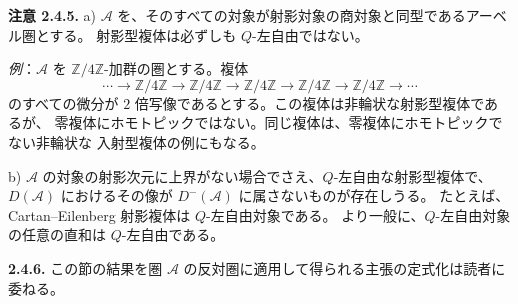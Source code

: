 \clearpage
{}%
\begingroup\small\setlength{\parskip}{0pt}\setlength{\emergencystretch}{1.5em}
\setlength{\abovedisplayskip}{4pt plus 2pt minus 2pt}%
\setlength{\belowdisplayskip}{4pt plus 2pt minus 2pt}%

\noindent\textbf{注意 2.4.5.}\quad
a) $\mathcal A$ を、そのすべての対象が射影対象の商対象と同型であるアーベル圏とする。
射影型複体は必ずしも $Q$-左自由ではない。

\emph{例}：$\mathcal A$ を $\mathbb Z/4\mathbb Z$-加群の圏とする。複体
\[
\cdots\longrightarrow\mathbb Z/4\mathbb Z
\longrightarrow\mathbb Z/4\mathbb Z
\longrightarrow\mathbb Z/4\mathbb Z
\longrightarrow\mathbb Z/4\mathbb Z
\longrightarrow\mathbb Z/4\mathbb Z\longrightarrow\cdots
\]
のすべての微分が $2$ 倍写像であるとする。この複体は非輪状な射影型複体であるが、
零複体にホモトピックではない。同じ複体は、零複体にホモトピックでない非輪状な
入射型複体の例にもなる。

b) $\mathcal A$ の対象の射影次元に上界がない場合でさえ、$Q$-左自由な射影型複体で、
$D(\mathcal A)$ におけるその像が $D^{-}(\mathcal A)$ に属さないものが存在しうる。
たとえば、Cartan--Eilenberg 射影複体は $Q$-左自由対象である。
より一般に、$Q$-左自由対象の任意の直和は $Q$-左自由である。

\medskip\noindent\textbf{2.4.6.}\quad
この節の結果を圏 $\mathcal A$ の反対圏に適用して得られる主張の定式化は読者に委ねる。
\endgroup
